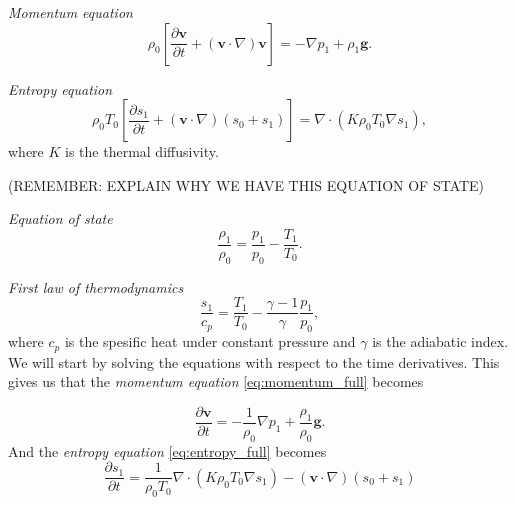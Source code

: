 \documentclass{article}
\begin{document}
\textit{Momentum equation}
\begin{equation}\label{eq:momentum_full}
    \rho_0\left[\frac{\partial\mathbf{v}}{\partial t}+(\mathbf{v}\cdot\nabla)\mathbf{v}\right]=-\nabla p_1 + \rho_1\mathbf{g}.
\end{equation}

\textit{Entropy equation}
\begin{equation}\label{eq:entropy_full}
    \rho_0 T_0 \left[\frac{\partial s_1}{\partial t} + (\mathbf{v}\cdot \nabla)(s_0+s_1) \right]
    = \nabla\cdot(K\rho_0T_0\nabla s_1),
\end{equation}
where $K$ is the thermal diffusivity.

(REMEMBER: EXPLAIN WHY WE HAVE THIS EQUATION OF STATE)

\textit{Equation of state}
\begin{equation}
    \frac{\rho_1}{\rho_0} = \frac{p_1}{p_0} - \frac{T_1}{T_0}.
\end{equation}

\textit{First law of thermodynamics}
\begin{equation}
    \frac{s_1}{c_p} = \frac{T_1}{T_0} - \frac{\gamma-1}{\gamma}\frac{p_1}{p_0},
\end{equation}
where $c_p$ is the spesific heat under constant pressure and $\gamma$ is the adiabatic index. We will start by solving the equations with respect to the time derivatives. This gives us that the \textit{momentum equation} \ref{eq:momentum_full} becomes

\begin{equation}\label{eq:momentum_wrt_t}
    \frac{\partial\mathbf{v}}{\partial t} = -\frac{1}{\rho_0}\nabla p_1 + \frac{\rho_1}{\rho_0}\mathbf{g}.
\end{equation}
And the \textit{entropy equation} \ref{eq:entropy_full} becomes
\begin{equation}\label{eq:entropy_wrt_t}
    \frac{\partial s_1}{\partial t} = \frac{1}{\rho_0 T_0} \nabla\cdot(K\rho_0 T_0 \nabla s_1) - (\mathbf{v}\cdot\nabla)(s_0+s_1)
\end{equation}
\end{document}
